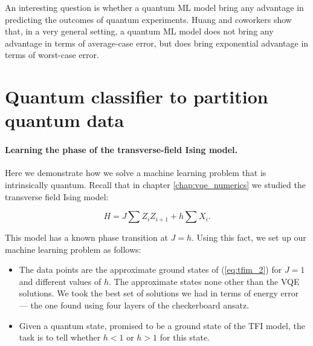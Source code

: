 

An interesting question is whether a quantum ML model bring any advantage in predicting the outcomes of quantum experiments. Huang and coworkers \cite{huang_information-theoretic_2021} show that, in a very general setting, a quantum ML model does not bring any advantage in terms of average-case error, but does bring exponential advantage in terms of worst-case error.

\section{Quantum classifier to partition quantum data}

\paragraph{Learning the phase of the transverse-field Ising model. } Here we demonstrate how we solve a machine learning problem that is intrinsically quantum. Recall that in chapter \ref{chap:vqe_numerics} we studied the transverse field Ising model:

\begin{equation}
\label{eq:tfim_2}
    H = J \sum Z_i Z_{i+1} + h \sum X_i.
\end{equation}

This model has a known phase transition at $J=h$. Using this fact, we set up our machine learning problem as follows:

\begin{itemize}
    \item The data points are the approximate ground states of (\ref{eq:tfim_2}) for $J=1$ and different values of $h$. The approximate states none other than the VQE solutions. We took the best set of solutions we had in terms of energy error --- the one found using four layers of the checkerboard ansatz.
    \item Given a quantum state, promised to be a ground state of the TFI model, the task is to tell whether $h<1$ or $h>1$ for this state.
\end{itemize}

